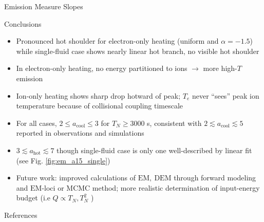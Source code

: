 \documentclass[final]{beamer}
\begin{document}
\begin{frame}
\begin{columns}[t]
\begin{column}{0.49\linewidth}
\begin{block}{Emission Measure Slopes}
\begin{figure}[htp]
					\label{fig:em_slopes}
				\end{figure}
				\vspace{-2ex}
			\end{block}
			\begin{block}{Conclusions}
				\vspace{-1ex}
				\begin{itemize}
					\item \alert{Pronounced hot shoulder for electron-only heating (uniform and $\alpha=-1.5$) while single-fluid case shows nearly linear hot branch, no visible hot shoulder}
					\item In electron-only heating, no energy partitioned to ions $\rightarrow$ more high-$T$ emission
					\item Ion-only heating shows sharp drop hotward of peak; $T_e$ never ``sees'' peak ion temperature because of collisional coupling timescale
					\item For all cases, \alert{$2\leq a_{\mathrm{cool}}\leq3$ for $T_N\geq3000$ s, consistent with $2\lesssim a_{\mathrm{cool}}\lesssim5$} reported in observations and simulations \citep[see Table 3 of][]{bradshaw_diagnosing_2012}
					\item $3\lesssim a_{\mathrm{hot}}\lesssim7$ though single-fluid case is only one well-described by linear fit (see Fig. \ref{fig:em_a15_single})
					\item Future work: \alert{improved calculations of $\mathrm{EM},~\mathrm{DEM}$ through forward modeling and $\mathrm{EM}$-loci or MCMC \citep{kashyap_markov-chain_1998} method}; more realistic determination of input-energy budget (i.e $Q\propto T_N,T_N^2$ \citep{cargill_active_2014})
				\end{itemize}
			\end{block}
	  	  	\begin{block}{References}
	  	  		\scriptsize
				\begin{multicols}{2}
	  			
	  	  		
				\end{multicols}
	  	  \end{block}
		\end{column}
	\end{columns}
\end{frame}
\end{document}
